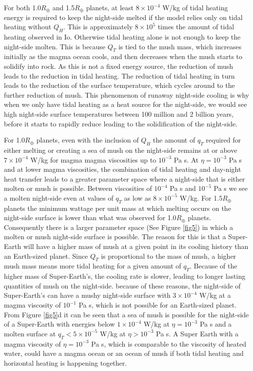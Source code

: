 \documentclass[fleqn,usenatbib]{mnras}
\begin{document}
For both 1.0$R_{\oplus}$ and 1.5$R_{\oplus}$ planets, at least $8 \times 10^{-4}$ W/kg of tidal heating energy is required to keep the night-side melted if the model relies only on tidal heating without $Q_{H}$. This is approximately $8 \times 10^{5}$ times the amount of tidal heating observed in Io. Otherwise tidal heating alone is not enough to keep the night-side molten. This is because $Q_{T}$ is tied to the mush mass, which increases initially as the magma ocean cools, and then decreases when the mush starts to solidify into rock. As this is not a fixed energy source, the reduction of mush leads to the reduction in tidal heating. The reduction of tidal heating in turn leads to the reduction of the surface temperature, which cycles around to the further reduction of mush. This phenomenon of runaway night-side cooling is why when we only have tidal heating as a heat source for the night-side, we would see high night-side surface temperatures between 100 million and 2 billion years, before it starts to rapidly reduce leading to the solidification of the night-side. 

For 1.0$R_{\oplus}$ planets, even with the inclusion of $Q_{H}$ the amount of $q_{T}$ required for either melting or creating a sea of mush on the night-side remains at or above $7 \times 10^{-4}$ W/kg for magma magma viscosities up to $10^{-3}$ Pa s. At $\eta = 10^{-3}$ Pa s and at lower magma viscosities, the combination of tidal heating and day-night heat transfer leads to a greater parameter space where a night-side that is either molten or mush is possible. Between viscosities of $10^{-4}$ Pa s and $10^{-5}$ Pa s we see a molten night-side even at values of $q_{T}$ as low as $8 \times 10^{-5}$ W/kg. For 1.5$R_{\oplus}$ planets the minimum wattage per unit mass at which melting occurs on the night-side surface is lower than what was observed for 1.0$R_{\oplus}$ planets. Consequently there is a larger parameter space (See Figure \ref{fig5}) in which a molten or mush night-side surface is possible. The reason for this is that a Super-Earth will have a higher mass of mush at a given point in its cooling history than an Earth-sized planet. Since $Q_{T}$ is proportional to the mass of mush, a higher mush mass means more tidal heating for a given amount of $q_{T}$. Because of the higher mass of Super-Earth's, the cooling rate is slower, leading to longer lasting quantities of mush on the night-side. because of these reasons, the night-side of Super-Earth's can have a mushy night-side surface with $3 \times 10^{-4}$ W/kg at a magma viscosity of $10^{-1}$ Pa s, which is not possible for an Earth-sized planet. From Figure \ref{fig5}d it can be seen that a sea of mush is possible for the night-side of a Super-Earth with energies below $1 \times 10^{-4}$ W/kg at $\eta = 10^{-3}$ Pa s and a molten surface at $q_{T} < 5 \times 10^{-5}$ W/kg at $\eta > 10^{-3}$ Pa s. A Super Earth with a magma viscosity of $\eta = 10^{-3}$ Pa s, which is comparable to the viscosity of heated water, could have a magma ocean or an ocean of mush if both tidal heating and horizontal heating is happening together. 
\end{document}
